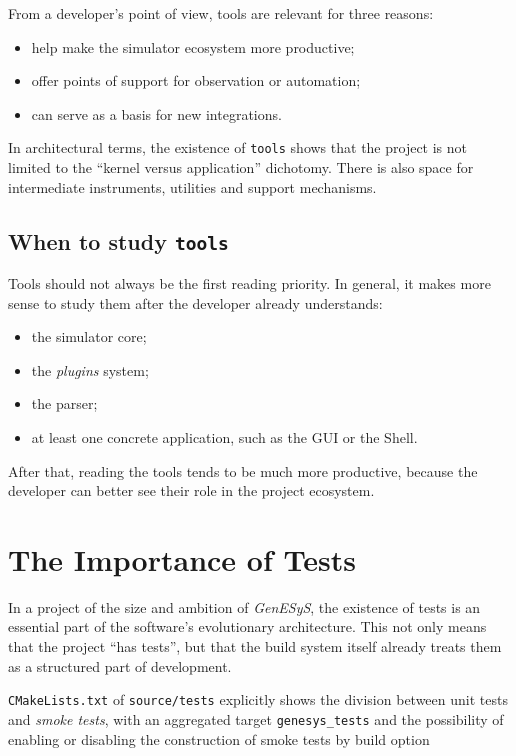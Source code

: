From a developer's point of view, tools are relevant for three reasons:
\begin{itemize}
 \item help make the simulator ecosystem more productive;
 \item offer points of support for observation or automation;
 \item can serve as a basis for new integrations.
\end{itemize}

In architectural terms, the existence of \texttt{tools} shows that the project is not limited to the ``kernel versus application'' dichotomy. There is also space for intermediate instruments, utilities and support mechanisms.

\subsection{When to study \texttt{tools}}
\label{subsec:cap10_quando_estudar_tools}

Tools should not always be the first reading priority. In general, it makes more sense to study them after the developer already understands:
\begin{itemize}
 \item the simulator core;
 \item the \textit{plugins} system;
 \item the parser;
 \item at least one concrete application, such as the GUI or the Shell.
\end{itemize}

After that, reading the tools tends to be much more productive, because the developer can better see their role in the project ecosystem.

\section{The Importance of Tests}
\label{sec:cap10_importancia_dos_testes}

In a project of the size and ambition of \textit{GenESyS}, the existence of tests is an essential part of the software's evolutionary architecture. This not only means that the project ``has tests'', but that the build system itself already treats them as a structured part of development.

\texttt{CMakeLists.txt} of \texttt{source/tests} explicitly shows the division between unit tests and \textit{smoke tests}, with an aggregated target \texttt{genesys\_tests} and the possibility of enabling or disabling the construction of smoke tests by build option

